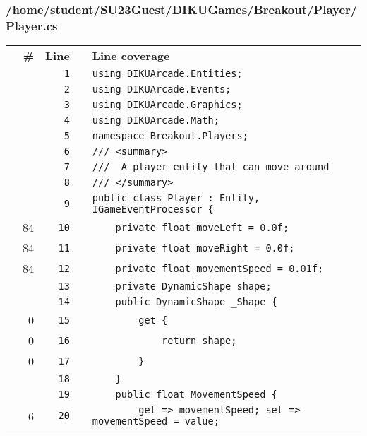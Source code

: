 \documentclass[a4paper,landscape,10pt]{article}
\begin{document}
\subsubsection{/home/student/SU23Guest/DIKUGames/Breakout/Player/Player.cs}
\begin{longtable}[l]{lrrll}
\textbf{} & \textbf{\#} & \textbf{Line} & \textbf{} & \textbf{Line coverage}\\
\cellcolor{gray} &  & \verb~1~ & & \verb~using DIKUArcade.Entities;~\\
\cellcolor{gray} &  & \verb~2~ & & \verb~using DIKUArcade.Events;~\\
\cellcolor{gray} &  & \verb~3~ & & \verb~using DIKUArcade.Graphics;~\\
\cellcolor{gray} &  & \verb~4~ & & \verb~using DIKUArcade.Math;~\\
\cellcolor{gray} &  & \verb~5~ & & \verb~namespace Breakout.Players;~\\
\cellcolor{gray} &  & \verb~6~ & & \verb~/// <summary>~\\
\cellcolor{gray} &  & \verb~7~ & & \verb~///  A player entity that can move around~\\
\cellcolor{gray} &  & \verb~8~ & & \verb~/// </summary>~\\
\cellcolor{gray} &  & \verb~9~ & & \verb~public class Player : Entity, IGameEventProcessor {~\\
\cellcolor{green} & 84 & \verb~10~ & & \verb~    private float moveLeft = 0.0f;~\\
\cellcolor{green} & 84 & \verb~11~ & & \verb~    private float moveRight = 0.0f;~\\
\cellcolor{green} & 84 & \verb~12~ & & \verb~    private float movementSpeed = 0.01f;~\\
\cellcolor{gray} &  & \verb~13~ & & \verb~    private DynamicShape shape;~\\
\cellcolor{gray} &  & \verb~14~ & & \verb~    public DynamicShape _Shape {~\\
\cellcolor{red} & 0 & \verb~15~ & & \verb~        get {~\\
\cellcolor{red} & 0 & \verb~16~ & & \verb~            return shape;~\\
\cellcolor{red} & 0 & \verb~17~ & & \verb~        }~\\
\cellcolor{gray} &  & \verb~18~ & & \verb~    }~\\
\cellcolor{gray} &  & \verb~19~ & & \verb~    public float MovementSpeed {~\\
\cellcolor{green} & 6 & \verb~20~ & & \verb~        get => movementSpeed; set => movementSpeed = value;~\\

\end{longtable}
\end{document}
